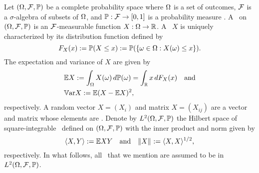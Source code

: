 Let $(\Omega, \mathcal{F}, \mathbb{P})$ be a complete probability space where $\Omega$ is a
set of outcomes, $\mathcal{F}$ is a $\sigma$-algebra of subsets of
$\Omega$, and $\mathbb{P}: \mathcal{F} \to [0, 1]$ is a
probability measure \cite{durrett2010}. A \rv\ on $(\Omega, \mathcal{F}, \mathbb{P})$ is an
$\mathcal{F}$-measurable function $X: \Omega \to \mathbb{R}$. A \rv\ $X$ is
uniquely characterized by its distribution function defined by
\begin{equation*}
  F_X(x) := \mathbb{P}(X \leq x) := \mathbb{P}(\{ \omega \in \Omega: X(\omega) \leq x \}).
\end{equation*}
The expectation and variance of $X$ are given by
\begin{align*}
  & \mathbb{E} X := \int_\Omega X(\omega) \, d\mathbb{P}(\omega) = \int_{\mathbb{R}} x \, d F_X(x) \hspace{1em} \text{and} \\
  & \mathbb{V}\text{ar} X := \mathbb{E} (X - \mathbb{E} X)^2,
\end{align*}
respectively. A random vector $X = (X_i)$ and matrix $X = (X_{ij})$ are a
vector and matrix whose elements are \rvs. Denote by $L^{2}(\Omega, \mathcal{F}, \mathbb{P})$
the Hilbert space of square-integrable \rvs\ defined on $(\Omega, \mathcal{F}, \mathbb{P})$
with the inner product and norm given by
\begin{equation*}
  \langle X, Y \rangle := \mathbb{E} X Y \hspace{1em} \text{and} \hspace{1em} \| X \|_{} := \langle X, X \rangle^{1/2},
\end{equation*}
respectively. In what follows, all \rvs\ that we mention are assumed to be in
$L^{2}(\Omega, \mathcal{F}, \mathbb{P})$.
